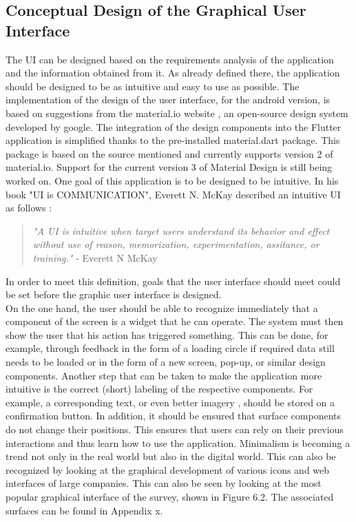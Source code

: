 \subsection{Conceptual Design of the Graphical User Interface}
The UI can be designed based on the requirements analysis of the application and the information obtained from it. As already defined there, the application should be designed to be as intuitive and easy to use as possible. The implementation of the design of the user interface, for the android version, is based on suggestions from the material.io website \cite{.materialio}, an open-source design system developed by google. The integration of the design components into the Flutter application is simplified thanks to the pre-installed material.dart package. This package is based on the source mentioned and currently supports version 2 of material.io. Support for the current version 3 of Material Design is still being worked on.
\noindent
One goal of this application is to be designed to be intuitive. In his book "UI is COMMUNICATION", Everett N. McKay described an intuitive UI as follows \cite{.mckay}: 
\begin{quote}
	\textit{"A UI is intuitive when target users understand its behavior and effect without use of reason, memorization, experimentation, assitance, or training."} - Everett N McKay \cite[p. 22]{.mckay}
\end{quote}
In order to meet this definition, goals that the user interface should meet could be set before the graphic user interface is designed.\\
\noindent
On the one hand, the user should be able to recognize immediately that a component of the screen is a widget that he can operate. The system must then show the user that his action has triggered something. This can be done, for example, through feedback in the form of a loading circle if required data still needs to be loaded or in the form of a new screen, pop-up, or similar design components. \cite{.mckay} Another step that can be taken to make the application more intuitive is the correct (short) labeling of the respective components. For example, a corresponding text, or even better imagery \cite[p. 172]{.essui}, should be stored on a confirmation button. In addition, it should be ensured that surface components do not change their positions. This ensures that users can rely on their previous interactions and thus learn how to use the application. Minimalism is becoming a trend not only in the real world but also in the digital world. This can also be recognized by looking at the graphical development of various icons and web interfaces of large companies. This can also be seen by looking at the most popular graphical interface of the survey, shown in Figure 6.2. The associated surfaces can be found in Appendix x.
